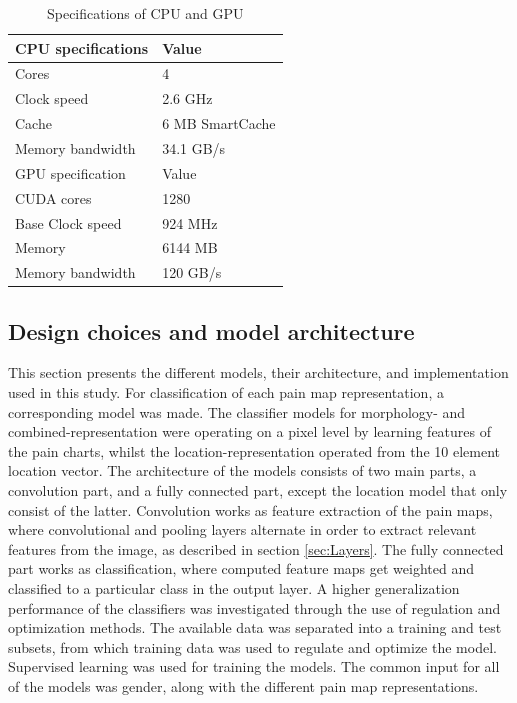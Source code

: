 
\begin{table}[H]
\centering
\begin{tabular}{p{4cm}|p{4cm}}
\hline
CPU specifications &  Value \\ \hline
Cores & 4 \\
Clock speed & 2.6 GHz \\
Cache & 6 MB SmartCache  \\
Memory bandwidth & 34.1 GB/s \\ \hline
GPU specification & Value \\ \hline
CUDA cores & 1280  \\
Base Clock speed & 924 MHz  \\
Memory & 6144 MB  \\
Memory bandwidth & 120 GB/s  \\ \hline
\end{tabular}
\caption{Specifications of CPU and GPU \citep{Intel,Nvidia}}
\label{tab:Specs}
\end{table}

\subsection{Design choices and model architecture}
This section presents the different models, their architecture, and implementation used in this study.
For classification of each pain map representation, a corresponding model was made. The classifier models for morphology- and combined-representation were operating on a pixel level by learning features of the pain charts, whilst the location-representation operated from the 10 element location vector.
The architecture of the models consists of two main parts, a convolution part, and a fully connected part, except the location model that only consist of the latter.  
Convolution works as feature extraction of the pain maps, where convolutional and pooling layers alternate in order to extract relevant features from the image, as described in section \autoref{sec:Layers}.
The fully connected part works as classification, where computed feature maps get weighted and classified to a particular class in the output layer.
A higher generalization performance of the classifiers was investigated through the use of regulation and optimization methods.
The available data was separated into a training and test subsets, from which training data was used to regulate and optimize the model.
Supervised learning was used for training the models. The common input for all of the models was gender, along with the different pain map representations.

